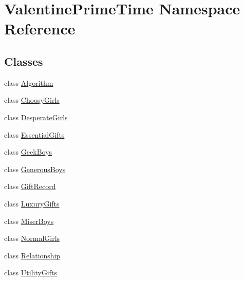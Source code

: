 \hypertarget{namespaceValentinePrimeTime}{}\section{Valentine\+Prime\+Time Namespace Reference}
\label{namespaceValentinePrimeTime}
\subsection*{Classes}
\begin{DoxyCompactItemize}
\item 
class \hyperlink{classValentinePrimeTime_1_1Algorithm}{Algorithm}
\item 
class \hyperlink{classValentinePrimeTime_1_1ChoosyGirls}{Choosy\+Girls}
\item 
class \hyperlink{classValentinePrimeTime_1_1DesperateGirls}{Desperate\+Girls}
\item 
class \hyperlink{classValentinePrimeTime_1_1EssentialGifts}{Essential\+Gifts}
\item 
class \hyperlink{classValentinePrimeTime_1_1GeekBoys}{Geek\+Boys}
\item 
class \hyperlink{classValentinePrimeTime_1_1GenerousBoys}{Generous\+Boys}
\item 
class \hyperlink{classValentinePrimeTime_1_1GiftRecord}{Gift\+Record}
\item 
class \hyperlink{classValentinePrimeTime_1_1LuxuryGifts}{Luxury\+Gifts}
\item 
class \hyperlink{classValentinePrimeTime_1_1MiserBoys}{Miser\+Boys}
\item 
class \hyperlink{classValentinePrimeTime_1_1NormalGirls}{Normal\+Girls}
\item 
class \hyperlink{classValentinePrimeTime_1_1Relationship}{Relationship}
\item 
class \hyperlink{classValentinePrimeTime_1_1UtilityGifts}{Utility\+Gifts}
\end{DoxyCompactItemize}

